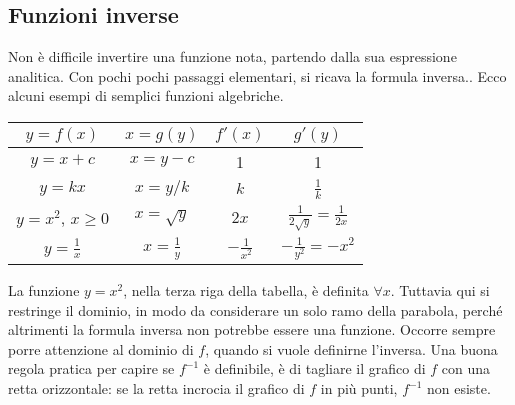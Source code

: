 \subsection{Funzioni inverse}
\label{subsec:diff01_derifuninverse}
Non è difficile invertire una funzione nota, partendo dalla sua espressione 
analitica.  Con pochi pochi passaggi elementari, si ricava la formula
inversa.. Ecco alcuni esempi di semplici funzioni algebriche.
\begin{center}
\begin{tabular}{|c|c|c|c|}
$y=f(x)$ & $x=g(y)$ & $f'(x)$ & $g'(y)$\\\hline
$y=x+c$ & $x=y-c$ & 1 & 1\\
$y=kx$ & $x=y/k$ & $k$ & $\frac{1}{k}$\\
$y=x^2$, $x\ge 0$ & $x=\sqrt{y}$ & $2x$ & 
$\frac{1}{2\sqrt{y}}=\frac{1}{2x}$\\
$y=\frac{1}{x}$ & $x=\frac{1}{y}$ & $-\frac{1}{x^2}$ & 
$-\frac{1}{y^2}=-x^2$\\
\hline
\end{tabular}
\end{center}

\begin{osservazione}
La funzione  $y=x^2$, nella terza riga della tabella, è definita $\forall 
x$.
Tuttavia qui si restringe il dominio, in modo da considerare un solo ramo 
della
parabola, perché altrimenti la formula inversa non potrebbe essere una 
funzione.
Occorre sempre porre attenzione al dominio di $f$, quando si vuole 
definirne 
l'inversa. Una buona regola pratica per capire se $f^{-1}$ è definibile, è 
di
tagliare il grafico di $f$ con una retta orizzontale: se la retta incrocia 
il 
grafico di $f$ in più punti, $f^{-1}$ non esiste.\\
\end{osservazione}

